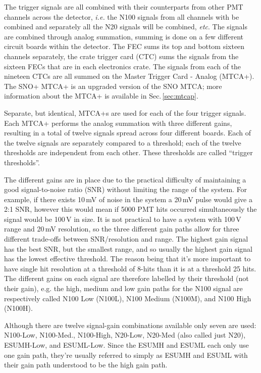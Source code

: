 The trigger signals are all combined with their counterparts from
other PMT channels across the detector, \textit{i.e.} the N100 signals
from all channels with be combined and separately all the
N20 signals will be combined, \textit{etc}.
The signals are combined through analog summation, summing is done on a few different
circuit boards within the detector.
The FEC sums its top and bottom sixteen channels separately, the crate
trigger card (CTC) sums the signals from the sixteen
FECs that are in each electronics crate.
The signals from each of the nineteen CTCs are all summed on the
Master Trigger Card - Analog (MTCA+). The SNO+ MTCA+ is an upgraded
version of the SNO MTCA\@; more information about the MTCA+ is available in
Sec.\,\ref{sec:mtcap}.

Separate, but identical, MTCA+s are used for each of the four trigger signals.
Each MTCA+ performs the analog summation with three different gains,
resulting in a total of twelve signals spread across four different boards.
Each of the twelve signals are separately compared to a threshold;
each of the twelve thresholds are independent from each other.
These thresholds are called ``trigger thresholds''.

The different gains are in place due to the practical difficulty of maintaining
a good signal-to-noise ratio (SNR) without limiting the range of the
system.
For example, if there exists 10\,mV of noise in the system a 20\,mV pulse
would give a 2:1 SNR, however this would mean if 5000 PMT hits occurred simultaneously
the signal would be 100\,V in size.
It is not practical to have a system with 100\,V range and 20\,mV resolution,
so the three different gain paths allow for three different trade-offs between
SNR/resolution and range.
The highest gain signal has the best SNR, but the smallest range, and so usually
the highest gain signal has the lowest effective threshold.
The reason being that it's more important to have single hit resolution at a threshold
of 8-hits than it is at a threshold 25 hits.
The different gains on each signal are therefore labelled by their threshold (not their gain), e.g.
the high, medium and low gain paths for the N100 signal are respectively called
N100 Low (N100L), N100 Medium (N100M), and N100 High (N100H).

Although there are twelve signal-gain combinations available only seven are
used: N100-Low, N100-Med., N100-High, N20-Low, N20-Med (also called just N20), ESUMH-Low, and ESUML-Low.
Since the ESUMH and ESUML each only use one gain path, they're usually
referred to simply as ESUMH and ESUML with their gain path understood to be
the high gain path.

